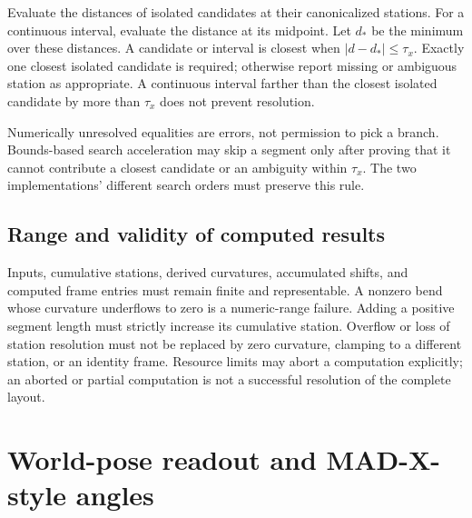 \documentclass[11pt,a4paper]{article}
\begin{document}
Evaluate the distances of isolated candidates at their canonicalized stations.
For a continuous interval, evaluate the distance at its midpoint. Let $d_*$
be the minimum over these distances. A candidate or interval is closest when
$|d-d_*|\le\tau_x$. Exactly one closest isolated candidate is required;
otherwise report missing or ambiguous station as appropriate. A continuous
interval farther than the closest isolated candidate by more than $\tau_x$
does not prevent resolution.

Numerically unresolved equalities are errors, not permission to pick a branch.
Bounds-based search acceleration may skip a segment only after proving that
it cannot contribute a closest candidate or an ambiguity within $\tau_x$.
The two implementations' different search orders must preserve this rule.

\subsection{Range and validity of computed results}

Inputs, cumulative stations, derived curvatures, accumulated shifts, and
computed frame entries must remain finite and representable. A nonzero bend
whose curvature underflows to zero is a numeric-range failure. Adding a
positive segment length must strictly increase its cumulative station.
Overflow or loss of station resolution must not be replaced by zero curvature,
clamping to a different station, or an identity frame. Resource limits may
abort a computation explicitly; an aborted or partial computation is not a
successful resolution of the complete layout.

\section{World-pose readout and MAD-X-style angles}
\label{sec:madx-angles}
\end{document}
